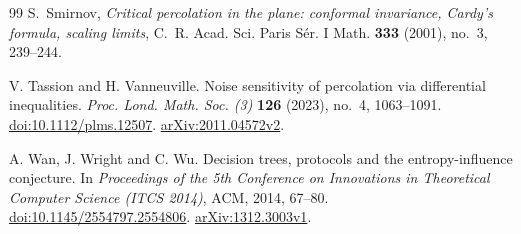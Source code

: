 \documentclass[11pt]{amsart}
\theoremstyle{remark}
\begin{document}
\begin{thebibliography}{99}
S.~Smirnov,
\emph{Critical percolation in the plane: conformal invariance, Cardy's formula, scaling limits},
C.~R. Acad. Sci. Paris S\'er. I Math. \textbf{333} (2001), no.~3, 239--244.

V. Tassion and H. Vanneuville.
Noise sensitivity of percolation via differential inequalities.
\emph{Proc. Lond. Math. Soc. (3)} \textbf{126} (2023), no.~4, 1063--1091.
\href{https://doi.org/10.1112/plms.12507}{doi:10.1112/plms.12507}.
\href{https://arxiv.org/abs/2011.04572v2}{arXiv:2011.04572v2}.

A. Wan, J. Wright and C. Wu.
Decision trees, protocols and the entropy-influence conjecture.
In \emph{Proceedings of the 5th Conference on Innovations in Theoretical
Computer Science (ITCS 2014)}, ACM, 2014, 67--80.
\href{https://doi.org/10.1145/2554797.2554806}{doi:10.1145/2554797.2554806}.
\href{https://arxiv.org/abs/1312.3003v1}{arXiv:1312.3003v1}.
\end{thebibliography}
\end{document}
